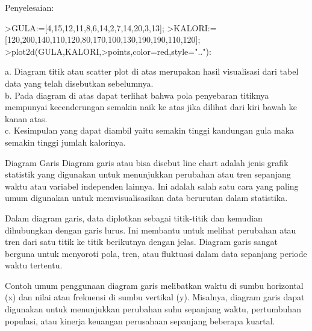 \documentclass[a4paper,10pt]{article}
\begin{document}
\begin{eulernotebook}
\begin{eulercomment}
\begin{eulercomment}
\begin{eulercomment}
\begin{eulercomment}
\begin{eulercomment}
\begin{eulercomment}
\begin{eulercomment}
\begin{eulercomment}
\begin{eulercomment}
\begin{eulercomment}
\begin{eulercomment}
\begin{eulercomment}
\begin{eulercomment}
\begin{eulercomment}
\begin{eulercomment}
\begin{eulercomment}
\begin{eulercomment}
Penyelesaian:
\end{eulercomment}
\begin{eulerprompt}
>GULA:=[4,15,12,11,8,6,14,2,7,14,20,3,13];
>KALORI:=[120,200,140,110,120,80,170,100,130,190,190,110,120];
>plot2d(GULA,KALORI,>points,color=red,style=".."):
\end{eulerprompt}
\begin{eulercomment}
a. Diagram titik atau scatter plot di atas merupakan hasil visualisasi
dari tabel data yang telah disebutkan sebelumnya.\\
b. Pada diagram di atas dapat terlihat bahwa pola penyebaran titiknya
mempunyai kecenderungan semakin naik ke atas jika dilihat dari kiri
bawah ke kanan atas.\\
c. Kesimpulan yang dapat diambil yaitu semakin tinggi kandungan gula
maka semakin tinggi jumlah kalorinya.
\end{eulercomment}
\eulersubheading{}
\begin{eulercomment}
Diagram Garis 
Diagram garis atau bisa disebut line chart adalah jenis grafik
statistik yang digunakan untuk menunjukkan perubahan atau tren
sepanjang waktu atau variabel independen lainnya. Ini adalah salah
satu cara yang paling umum digunakan untuk memvisualisasikan data
berurutan dalam statistika.

Dalam diagram garis, data diplotkan sebagai titik-titik dan kemudian
dihubungkan dengan garis lurus. Ini membantu untuk melihat perubahan
atau tren dari satu titik ke titik berikutnya dengan jelas. Diagram
garis sangat berguna untuk menyoroti pola, tren, atau fluktuasi dalam
data sepanjang periode waktu tertentu.

Contoh umum penggunaan diagram garis melibatkan waktu di sumbu
horizontal (x) dan nilai atau frekuensi di sumbu vertikal (y).
Misalnya, diagram garis dapat digunakan untuk menunjukkan perubahan
suhu sepanjang waktu, pertumbuhan populasi, atau kinerja keuangan
perusahaan sepanjang beberapa kuartal.


\end{eulercomment}
\end{eulercomment}
\end{eulercomment}
\end{eulercomment}
\end{eulercomment}
\end{eulercomment}
\end{eulercomment}
\end{eulercomment}
\end{eulercomment}
\end{eulercomment}
\end{eulercomment}
\end{eulercomment}
\end{eulercomment}
\end{eulercomment}
\end{eulercomment}
\end{eulercomment}
\end{eulercomment}
\end{eulernotebook}
\end{document}
